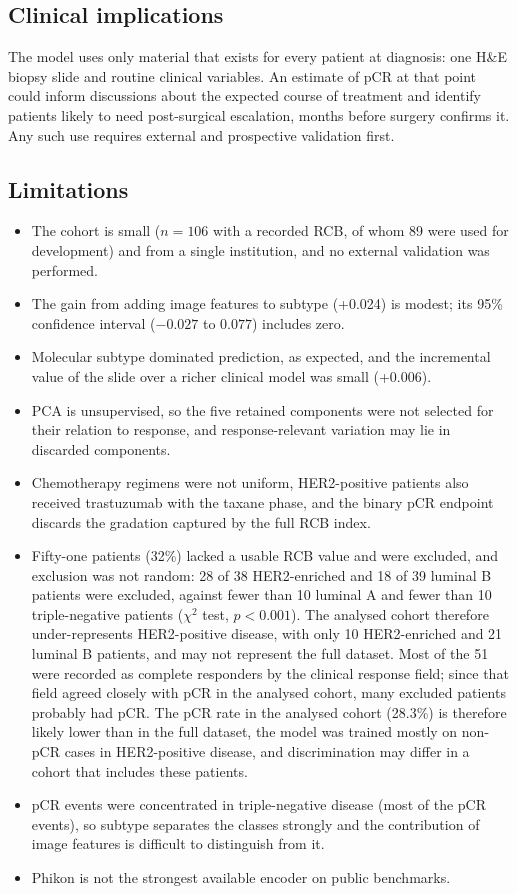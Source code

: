 \documentclass[10pt,a4paper,twocolumn]{article}
\begin{document}
\subsection{Clinical implications}
The model uses only material that exists for every patient at diagnosis: one H\&E biopsy slide and routine clinical variables. An estimate of pCR at that point could inform discussions about the expected course of treatment and identify patients likely to need post-surgical escalation, months before surgery confirms it. Any such use requires external and prospective validation first.

\subsection{Limitations}
\begin{itemize}[nosep]
  \item The cohort is small ($n = 106$ with a recorded RCB, of whom 89 were used for development) and from a single institution, and no external validation was performed.
  \item The gain from adding image features to subtype (+0.024) is modest; its 95\% confidence interval ($-0.027$ to $0.077$) includes zero.
  \item Molecular subtype dominated prediction, as expected, and the incremental value of the slide over a richer clinical model was small (+0.006).
  \item PCA is unsupervised, so the five retained components were not selected for their relation to response, and response-relevant variation may lie in discarded components.
  \item Chemotherapy regimens were not uniform, HER2-positive patients also received trastuzumab with the taxane phase, and the binary pCR endpoint discards the gradation captured by the full RCB index.
  \item Fifty-one patients (32\%) lacked a usable RCB value and were excluded, and exclusion was not random: 28 of 38 HER2-enriched and 18 of 39 luminal B patients were excluded, against fewer than 10 luminal A and fewer than 10 triple-negative patients ($\chi^2$ test, $p < 0.001$). The analysed cohort therefore under-represents HER2-positive disease, with only 10 HER2-enriched and 21 luminal B patients, and may not represent the full dataset. Most of the 51 were recorded as complete responders by the clinical response field; since that field agreed closely with pCR in the analysed cohort, many excluded patients probably had pCR. The pCR rate in the analysed cohort (28.3\%) is therefore likely lower than in the full dataset, the model was trained mostly on non-pCR cases in HER2-positive disease, and discrimination may differ in a cohort that includes these patients.
  \item pCR events were concentrated in triple-negative disease (most of the pCR events), so subtype separates the classes strongly and the contribution of image features is difficult to distinguish from it.
  \item Phikon is not the strongest available encoder on public benchmarks.
\end{itemize}
\end{document}
